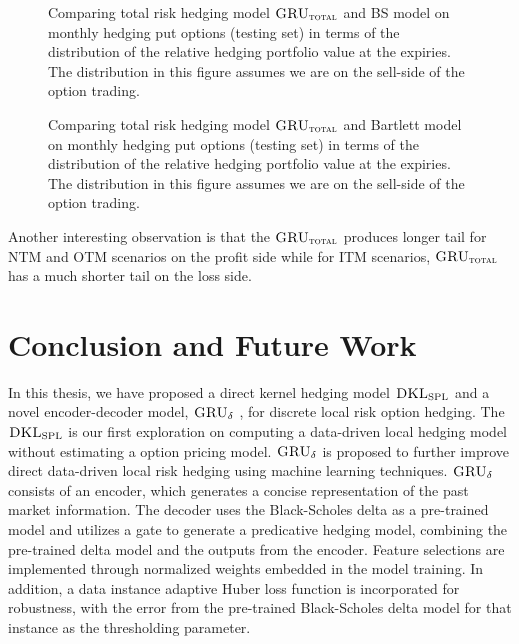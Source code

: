 \documentclass[letterpaper,12pt,titlepage,oneside,final]{book}
\numberwithin{equation}{section}
\theoremstyle{definition}
\newcommand{\model}{\textsc{GRU}_\delta}
\newcommand{\modelT}{\textsc{GRU}_{\textsc{total}}}
\newcommand{\DKLs}{\bf\textsc{DKL}_{\text{SPL}}}
\begin{document}
\begin{figure}[htp!]
		\caption{Comparing total risk hedging model $\modelT$ and BS model on monthly hedging put options (testing set) in terms of the distribution of the  relative hedging portfolio value at the expiries. The distribution in this figure assumes we are on the sell-side of the option trading.}  \label{fig:putTotalM2}
	\centering
		\caption{Comparing total risk hedging model $\modelT$ and Bartlett model on monthly hedging put options (testing set) in terms of the distribution of the  relative hedging portfolio value at the expiries. The distribution in this figure assumes we are on the sell-side of the option trading.} \label{fig:putTotalM3}
\end{figure}
Another interesting observation is that the $\modelT$ produces longer tail for NTM and OTM scenarios on the profit side while for ITM scenarios, $\modelT$  has a much shorter tail on the loss side.
\chapter{Conclusion and Future Work}
\label{sec:Conclusion}

In this thesis, we have proposed a direct kernel hedging model $\DKLs$ and a novel encoder-decoder  model, $\model$ , for discrete local risk option hedging. The $\DKLs$ is our first exploration on computing a data-driven local hedging model without estimating a option pricing model. $\model$ is proposed to further improve direct data-driven local risk hedging using machine learning techniques. $\model$ consists of an encoder, which generates a concise representation of the past market  information. The decoder uses the Black-Scholes delta as a pre-trained model and utilizes a gate to generate a predicative hedging model,  combining the pre-trained delta model and the outputs from the encoder. Feature selections are implemented through normalized weights embedded in the model training. In addition, a data instance adaptive Huber loss function is incorporated  for robustness, with the error from the pre-trained Black-Scholes delta model for that instance as the thresholding parameter. 
\end{document}
